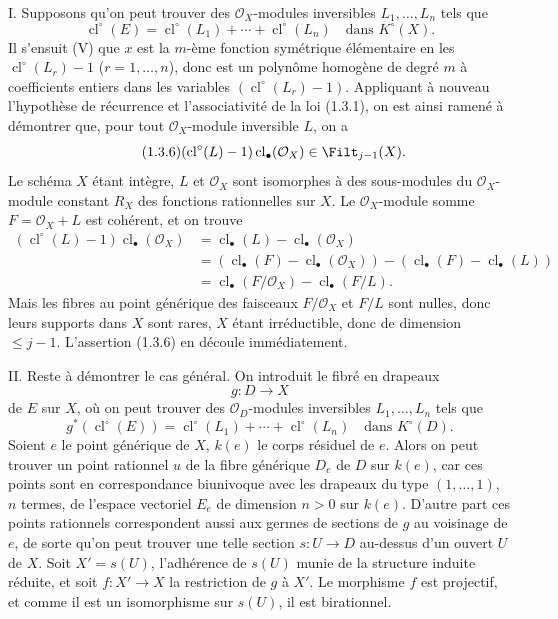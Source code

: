 \documentclass[11pt]{article}
\newcommand{\cl}{\operatorname{cl}}
\begin{document}
I. Supposons qu'on peut trouver des $\mathcal O_X$-modules inversibles $L_1,\ldots,L_n$ tels que
\[
\cl^\circ(E)=\cl^\circ(L_1)+\cdots+\cl^\circ(L_n)\quad\text{dans }K^\circ(X).
\]
Il s'ensuit (V) que $x$ est la $m$-ème fonction symétrique élémentaire en les $\cl^\circ(L_r)-1$ ($r=1,\ldots,n$), donc est un polynôme homogène de degré $m$ à coefficients entiers dans les variables $(\cl^\circ(L_r)-1)$. Appliquant à nouveau l'hypothèse de récurrence et l'associativité de la loi (1.3.1), on est ainsi ramené à démontrer que, pour tout $\mathcal O_X$-module inversible $L$, on a
\begin{equation}\tag{1.3.6}
(\cl^\circ(L)-1)\cl_\bullet(\mathcal O_X)\in\Filt_{j-1}(X).
\end{equation}
Le schéma $X$ étant intègre, $L$ et $\mathcal O_X$ sont isomorphes à des sous-modules du $\mathcal O_X$-module constant $R_X$ des fonctions rationnelles sur $X$. Le $\mathcal O_X$-module somme $F=\mathcal O_X+L$ est cohérent, et on trouve
\begin{align*}
(\cl^\circ(L)-1)\cl_\bullet(\mathcal O_X)
&=\cl_\bullet(L)-\cl_\bullet(\mathcal O_X)\\
&=(\cl_\bullet(F)-\cl_\bullet(\mathcal O_X))-(\cl_\bullet(F)-\cl_\bullet(L))\\
&=\cl_\bullet(F/\mathcal O_X)-\cl_\bullet(F/L).
\end{align*}
Mais les fibres au point générique des faisceaux $F/\mathcal O_X$ et $F/L$ sont nulles, donc leurs supports dans $X$ sont rares, $X$ étant irréductible, donc de dimension $\leq j-1$. L'assertion (1.3.6) en découle immédiatement.

II. Reste à démontrer le cas général. On introduit le fibré en drapeaux
\[
g:D\longrightarrow X
\]
de $E$ sur $X$, où on peut trouver des $\mathcal O_D$-modules inversibles $L_1,\ldots,L_n$ tels que
\begin{equation}\tag{1.3.7}
g^*(\cl^\circ(E))=\cl^\circ(L_1)+\cdots+\cl^\circ(L_n)\quad\text{dans }K^\circ(D).
\end{equation}
Soient $e$ le point générique de $X$, $k(e)$ le corps résiduel de $e$. Alors on peut trouver un point rationnel $u$ de la fibre générique $D_e$ de $D$ sur $k(e)$, car ces points sont en correspondance biunivoque avec les drapeaux du type $(1,\ldots,1)$, $n$ termes, de l'espace vectoriel $E_e$ de dimension $n>0$ sur $k(e)$. D'autre part ces points rationnels correspondent aussi aux germes de sections de $g$ au voisinage de $e$, de sorte qu'on peut trouver une telle section $s:U\to D$ au-dessus d'un ouvert $U$ de $X$. Soit $X'=s(U)$, l'adhérence de $s(U)$ munie de la structure induite réduite, et soit $f:X'\to X$ la restriction de $g$ à $X'$. Le morphisme $f$ est projectif, et comme il est un isomorphisme sur $s(U)$, il est birationnel.
\end{document}
